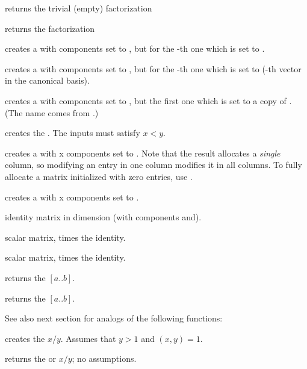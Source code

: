  returns the trivial (empty) factorization

 returns the factorization

 creates a  with 
components set to , but for the -th one which is set to
.

 creates a  with 
components set to , but for the -th one which is set to
 (-th vector in the canonical basis).

 creates a  with 
components set to , but the first one which is set to a copy
of . (The name comes from .)

\smallskip

 creates the  .
The inputs must satisfy $x < y$.

 creates a  with  x 
components set to . Note that the result allocates a
\emph{single} column, so modifying an entry in one column modifies it in
all columns. To fully allocate a matrix initialized with zero entries,
use .

 creates a  with  x
 components set to .

 identity matrix in dimension  (with
components  and).

 scalar matrix,  times the identity.

 scalar matrix,  times
the identity.

 returns the  $[a..b]$.

 returns the  $[a..b]$.

\smallskip
See also next section for analogs of the following functions:

 creates the  $x/y$. Assumes that
$y > 1$ and $(x,y) = 1$.

 returns the  or  $x/y$;
no assumptions.

